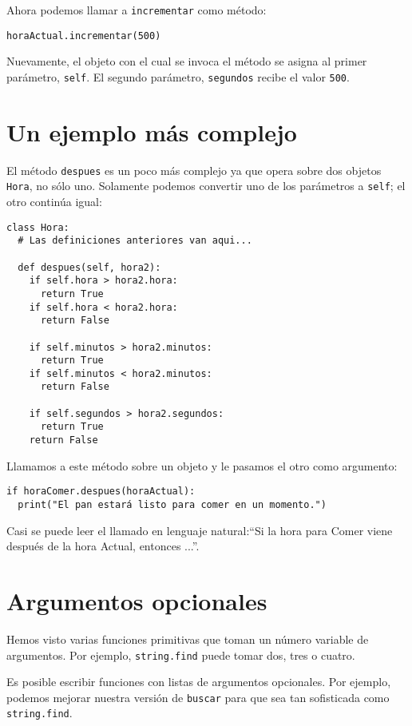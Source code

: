 Ahora podemos llamar a \texttt{incrementar} como método:
\begin{verbatim}
horaActual.incrementar(500)
\end{verbatim}

Nuevamente, el objeto con el cual se invoca el método se asigna al
primer parámetro, \texttt{self}. El segundo parámetro, \texttt{segundos}
recibe el valor \texttt{500}.

\section{Un ejemplo más complejo}

El método \texttt{despues} es un poco más complejo ya que opera sobre
dos objetos \texttt{Hora}, no sólo uno. Solamente podemos convertir
uno de los parámetros a \texttt{self}; el otro continúa igual:

\begin{verbatim}
class Hora:
  # Las definiciones anteriores van aqui...

  def despues(self, hora2):
    if self.hora > hora2.hora:
      return True
    if self.hora < hora2.hora:
      return False

    if self.minutos > hora2.minutos:
      return True
    if self.minutos < hora2.minutos:
      return False

    if self.segundos > hora2.segundos:
      return True
    return False
\end{verbatim}
 Llamamos a este método sobre un objeto y le pasamos el otro como
argumento:
\begin{verbatim}
if horaComer.despues(horaActual):
  print("El pan estará listo para comer en un momento.")
\end{verbatim}

Casi se puede leer el llamado en lenguaje natural:``Si la hora para
Comer viene después de la hora Actual, entonces ...''.

\section{Argumentos opcionales}

Hemos visto varias funciones primitivas que toman un número variable
de argumentos. Por ejemplo, \texttt{string.find} puede tomar dos,
tres o cuatro.

Es posible escribir funciones con listas de argumentos opcionales.
Por ejemplo, podemos mejorar nuestra versión de \texttt{buscar} para
que sea tan sofisticada como \texttt{string.find}.

